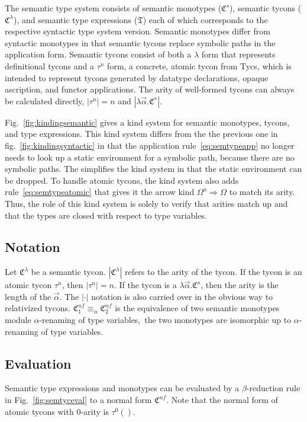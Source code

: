 The semantic type system consists of semantic monotypes ($\mathfrak{C}^s$), semantic tycons ($\mathfrak{C}^\lambda$), and semantic type expressions ($\mathfrak{T}$) each of which corresponds to the respective syntactic type system version. Semantic monotypes differ from syntactic monotypes in that semantic tycons replace symbolic paths in the application form. Semantic tycons consist of both a $\lambda$ form that represents definitional tycons and a $\tau^n$ form, a concrete, atomic tycon from Tycs, which is intended to represent tycons generated by datatype declarations, opaque ascription, and functor applications. The arity of well-formed tycons can always be calculated directly, $|\tau^n| = n$ and $|\lambda\vec{\alpha}.\mathfrak{C}^s|$. 



Fig.~\ref{fig:kindingsemantic} gives a kind system for semantic monotypes, tycons, and type expressions. This kind system differs from the the previous one in fig.~\ref{fig:kindingsyntactic} in that the application rule~\ref{eq:semtypeapp} no longer needs to look up a static environment for a symbolic path, because there are no symbolic paths. The simplifies the kind system in that the static environment can be dropped. To handle atomic tycons, the kind system also adds rule~\ref{eq:semtypeatomic} that gives it the arrow kind $\Omega^n\Rightarrow\Omega$ to match its arity. Thus, the role of this kind system is solely to verify that arities match up and that the types are closed with respect to type variables.  

\subsection{Notation}\label{sec:typesystem-notation}
Let $\mathfrak{C}^\lambda$ be a semantic tycon. $|\mathfrak{C}^\lambda|$ refers to the arity of the tycon. If the tycon is an atomic tycon $\tau^n$, then $|\tau^n|=n$. If the tycon is a $\lambda\vec{\alpha}.\mathfrak{C}^s$, then the arity is the length of the $\vec{\alpha}$. The $|\cdot|$ notation is also carried over in the obvious way to relativized tycons. $\mathfrak{C}^{nf}_1 \equiv_\alpha \mathfrak{C}^{nf}_2$ is the equivalence of two semantic monotypes module $\alpha$-renaming of type variables,\ie~the two monotypes are isomorphic up to $\alpha$-renaming of type variables. 

\subsection{Evaluation}
Semantic type expressions and monotypes can be evaluated by a $\beta$-reduction rule in Fig.~\ref{fig:semtyceval} to a normal form $\mathfrak{C}^{nf}$. Note that the normal form of atomic tycons with 0-arity is $\tau^0()$. 

